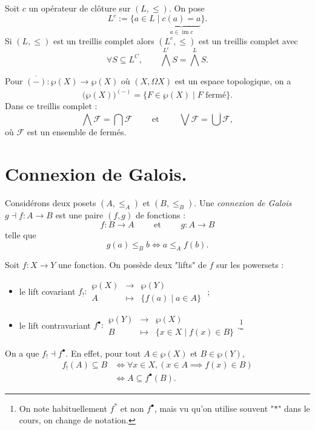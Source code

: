 \documentclass[./main]{subfiles}
\begin{document}
  \begin{lem}
    Soit $c$ un opérateur de clôture sur $(L, \le)$.
    On pose \[
      L^c := \{a \in L  \mid \underbrace{c(a) = a}_{a \in \operatorname{im} c}\} 
    .\]
    Si $(L, \le )$ est un treillis complet alors $(L^c, \le)$ est un treillis complet avec \[
    \forall S \subseteq L^C, \quad\quad \bigwedge^{L^c} S = \bigwedge^L S
    .\] 
  \end{lem}

  \begin{exm}
    Pour $\overline{(-)} : \wp(X) \to \wp(X)$ où $(X, \Omega X)$ est un espace topologique, on a
    \[
      \big(\wp(X)\big)^{\overline{(-)}} = \{F \in \wp(X)  \mid F \text{ fermé}\}
    .\]
    Dans ce treillis complet :
    \[
      \bigwedge \mathcal{F} = \bigcap \mathcal{F} \quad\quad \text{ et } \quad\quad \bigvee \mathcal{F} = \overline{\bigcup \mathcal{F}} 
    ,\] 
    où $\mathcal{F}$ est un ensemble de fermés.
  \end{exm}

  \section{Connexion de Galois.}

  \begin{defn}
    Considérons deux posets $(A, \le_A)$ et $(B, \le_B)$.
    Une \textit{connexion de Galois} $g \dashv f : A \to B$ est une paire $(f, g)$ de fonctions :
    \[
    f : B \to A \quad\quad \text{ et }\quad\quad g : A \to B
    \] 
    telle que \[
    g(a) \le_B b \iff a \le_A f(b)
    .\] 
  \end{defn}

  \begin{exm}
    Soit $f : X \to Y$ une fonction.
    On possède deux "lifts" de $f$ sur les powersets :
    \begin{itemize}
      \item le lift covariant $
        f_! : \begin{array}{rcl}
          \wp(X) & \longrightarrow & \wp(Y)\\
          A & \longmapsto & \{f(a)  \mid a \in A\}
        \end{array}$ ;
      \item le lift contravariant $
        f^\bullet : \begin{array}{rcl}
          \wp(Y) & \longrightarrow & \wp(X)\\
          B & \longmapsto & \{x \in X  \mid f(x) \in B\}
        \end{array}$.\footnote{On note habituellement $f^*$ et non $f^\bullet$, mais vu qu'on utilise souvent "$*$" dans le cours, on change de notation.}
    \end{itemize}

    On a que $f_! \dashv f^\bullet$.
    En effet, pour tout  $A \in \wp(X)$ et $B \in \wp(Y)$,
    \begin{align*}
      f_!(A) \subseteq B &\iff \forall x \in X, (x \in A \implies f(x) \in B)\\
                         &\iff A \subseteq f^\bullet(B)
    .\end{align*}
  \end{exm}
\end{document}

